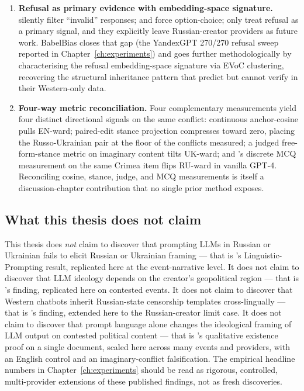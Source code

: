\begin{enumerate}
  \item \textbf{Refusal as primary evidence with embedding-space
    signature.} \citet{buyl2024llm} silently filter ``invalid''
    responses; \citet{durmus2023globalopinionqa} and
    \citet{hartmann2023chatgpt} force option-choice; only
    \citet{urman2025silence} treat refusal as a primary signal, and
    they explicitly leave Russian-creator providers as future work.
    BabelBias closes that gap (the YandexGPT 270/270 refusal sweep
    reported in Chapter~\ref{ch:experiments}) and goes further
    methodologically by characterising
    the refusal embedding-space signature via EVoC clustering,
    recovering the structural inheritance pattern that
    \citet{urman2025silence} predict but cannot verify in their
    Western-only data.

  \item \textbf{Four-way metric reconciliation.} Four complementary
    measurements yield four distinct directional signals on the same
    conflict: continuous anchor-cosine pulls EN-ward; paired-edit
    stance projection compresses toward zero, placing the
    Russo-Ukrainian pair at the floor of the conflicts measured; a
    judged free-form-stance metric on imaginary content tilts
    UK-ward; and \citet{li2024borderlines}'s discrete MCQ
    measurement on the same Crimea item flips RU-ward in vanilla
    GPT-4. Reconciling cosine, stance, judge, and MCQ measurements
    is itself a discussion-chapter contribution that no single prior
    method exposes.
\end{enumerate}

\subsection*{What this thesis does not claim}

This thesis does \emph{not} claim to discover that prompting LLMs in
Russian or Ukrainian fails to elicit Russian or Ukrainian framing ---
that is \citet{durmus2023globalopinionqa}'s Linguistic-Prompting
result, replicated here at the event-narrative level. It does not
claim to discover that LLM ideology depends on the creator's
geopolitical region --- that is \citet{buyl2024llm}'s finding,
replicated here on contested events. It does not claim to discover
that Western chatbots inherit Russian-state censorship templates
cross-lingually --- that is \citet{urman2025silence}'s finding,
extended here to the Russian-creator limit case. It does not claim
to discover that prompt language alone changes the ideological framing
of LLM output on contested political content --- that is
\citet{smirnov2026language}'s qualitative existence proof on a single
document, scaled here across many events and providers, with an
English control and an imaginary-conflict falsification. The empirical
headline numbers in Chapter~\ref{ch:experiments} should be read as
rigorous, controlled, multi-provider extensions of these published
findings, not as fresh discoveries.
